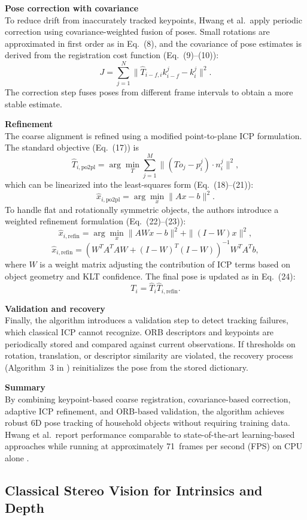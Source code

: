\textbf{Pose correction with covariance} \\
To reduce drift from inaccurately tracked keypoints, Hwang et al.\ apply periodic correction using covariance-weighted fusion of poses. Small rotations are approximated in first order as in Eq.~(8), and the covariance of pose estimates is derived from the registration cost function (Eq.~(9)–(10)):
\[
J = \sum_{j=1}^N \|\hat{T}_{i-f,i}k^j_{i-f} - k^j_i\|^2.
\]
The correction step fuses poses from different frame intervals to obtain a more stable estimate.

\textbf{Refinement} \\
The coarse alignment is refined using a modified point-to-plane ICP formulation. The standard objective (Eq.~(17)) is
\[
\hat{T}_{i,\mathrm{po2pl}} = \arg\min_T \sum_{j=1}^M \|(T o_j - p^j_i)\cdot n^j_i\|^2,
\]
which can be linearized into the least-squares form (Eq.~(18)–(21)):
\[
\hat{x}_{i,\mathrm{po2pl}} = \arg\min_x \|Ax - b\|^2.
\]
To handle flat and rotationally symmetric objects, the authors introduce a weighted refinement formulation (Eq.~(22)–(23)):
\[
\hat{x}_{i,\mathrm{refin}} = \arg\min_x \|AWx - b\|^2 + \|(I-W)x\|^2,
\]
\[
\hat{x}_{i,\mathrm{refin}} = (W^TA^TAW + (I-W)^T(I-W))^{-1}W^TA^Tb,
\]
where $W$ is a weight matrix adjusting the contribution of ICP terms based on object geometry and KLT confidence. The final pose is updated as in Eq.~(24):
\[
T_i = \hat{T}_i \hat{T}_{i,\mathrm{refin}}.
\]

\textbf{Validation and recovery} \\
Finally, the algorithm introduces a validation step to detect tracking failures, which classical ICP cannot recognize. ORB descriptors and keypoints are periodically stored and compared against current observations. If thresholds on rotation, translation, or descriptor similarity are violated, the recovery process (Algorithm~3 in \cite{hwang2025icp}) reinitializes the pose from the stored dictionary.

\textbf{Summary} \\
By combining keypoint-based coarse registration, covariance-based correction, adaptive ICP refinement, and ORB-based validation, the algorithm achieves robust 6D pose tracking of household objects without requiring training data. Hwang et al.\ report performance comparable to state-of-the-art learning-based approaches while running at approximately 71~frames per second (FPS) on CPU alone \cite{hwang2025icp}.

\subsection{Classical Stereo Vision for Intrinsics and Depth}
\label{appendix:stereo}

